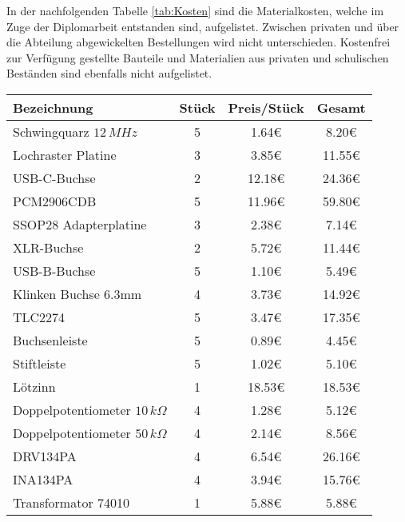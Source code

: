 In der nachfolgenden Tabelle \ref{tab:Kosten} sind die Materialkosten, welche im Zuge der Diplomarbeit entstanden sind, aufgelistet. Zwischen privaten und über die Abteilung abgewickelten Bestellungen wird nicht unterschieden. Kostenfrei zur Verfügung gestellte Bauteile und Materialien aus privaten und schulischen Beständen sind ebenfalls nicht aufgelistet.

\begin{longtable}{l|c|c|c}
      {\textbf{Bezeichnung}} & {\textbf{Stück}} & {\textbf{Preis/Stück}} & {\textbf{Gesamt}} \\
      \hline
      \hline
      {Schwingquarz $12\,MHz$} & {5} & {1.64\euro{}} & {8.20\euro{}} \\
      \hline
      {Lochraster Platine} & {3} & {3.85\euro{}} & {11.55\euro{}} \\
      \hline
      {USB-C-Buchse} & {2} & {12.18\euro{}} & {24.36\euro{}} \\
      \hline
      {PCM2906CDB} & {5} & {11.96\euro{}} & {59.80\euro{}} \\
      \hline
      {SSOP28 Adapterplatine} & {3} & {2.38\euro{}} & {7.14\euro{}} \\
      \hline
      {XLR-Buchse} & {2} & {5.72\euro{}} & {11.44\euro{}} \\
      \hline
      {USB-B-Buchse} & {5} & {1.10\euro{}} & {5.49\euro{}} \\
      \hline
      {Klinken Buchse 6.3mm} & {4} & {3.73\euro{}} & {14.92\euro{}} \\
      \hline
      {TLC2274} & {5} & {3.47\euro{}} & {17.35\euro{}} \\
      \hline
      {Buchsenleiste} & {5} & {0.89\euro{}} & {4.45\euro{}} \\
      \hline
      {Stiftleiste} & {5} & {1.02\euro{}} & {5.10\euro{}} \\
      \hline
      {Lötzinn} & {1} & {18.53\euro{}} & {18.53\euro{}} \\
      \hline
      {Doppelpotentiometer $10\,k\Omega$} & {4} & {1.28\euro{}} & {5.12\euro{}} \\
      \hline
      {Doppelpotentiometer $50\,k\Omega$} & {4} & {2.14\euro{}} & {8.56\euro{}} \\
      \hline
      {DRV134PA} & {4} & {6.54\euro{}} & {26.16\euro{}} \\
      \hline
      {INA134PA} & {4} & {3.94\euro{}} & {15.76\euro{}} \\
      \hline
      {Transformator 74010} & {1} & {5.88\euro{}} & {5.88\euro{}} \\

\end{longtable}
